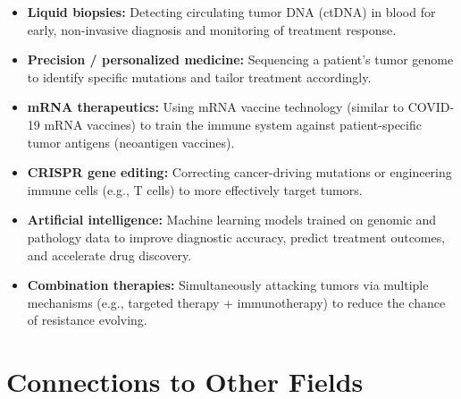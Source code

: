 \documentclass[11pt, letterpaper]{article}
\begin{document}
\begin{itemize}[noitemsep]
  \item \textbf{Liquid biopsies:} Detecting circulating tumor DNA (ctDNA) in blood for early, non-invasive diagnosis and monitoring of treatment response.
  \item \textbf{Precision / personalized medicine:} Sequencing a patient's tumor genome to identify specific mutations and tailor treatment accordingly.
  \item \textbf{mRNA therapeutics:} Using mRNA vaccine technology (similar to COVID-19 mRNA vaccines) to train the immune system against patient-specific tumor antigens (neoantigen vaccines).
  \item \textbf{CRISPR gene editing:} Correcting cancer-driving mutations or engineering immune cells (e.g., T cells) to more effectively target tumors.
  \item \textbf{Artificial intelligence:} Machine learning models trained on genomic and pathology data to improve diagnostic accuracy, predict treatment outcomes, and accelerate drug discovery.
  \item \textbf{Combination therapies:} Simultaneously attacking tumors via multiple mechanisms (e.g., targeted therapy + immunotherapy) to reduce the chance of resistance evolving.
\end{itemize}

\section*{Connections to Other Fields}
\end{document}
